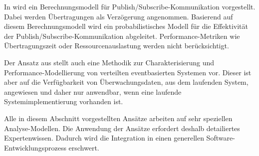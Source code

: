In \cite{baldoni} wird ein Berechnungsmodell für Publish/Subscribe-Kommunikation vorgestellt. Dabei werden Übertragungen als Verzögerung angenommen. Basierend auf diesem Berechnungsmodell wird ein probabilistisches Modell für die Effektivität der Publish/Subscribe-Kommunikation abgeleitet. Performance-Metriken wie Übertragungszeit oder Ressourcenauslastung werden nicht berücksichtigt. \par
Der Ansatz aus \cite{Kounev2008} stellt auch eine Methodik zur Charakterisierung und Performance-Modellierung von verteilten eventbasierten Systemen vor. Dieser ist aber auf die Verfügbarkeit von Überwachungsdaten, aus dem laufenden System, angewiesen und daher nur anwendbar, wenn eine laufende Systemimplementierung vorhanden ist. \par
Alle in diesem Abschnitt vorgestellten Ansätze arbeiten auf sehr speziellen Analyse-Modellen. Die Anwendung der Ansätze erfordert deshalb detailiertes Expertenwissen. Dadurch wird die Integration in einen generellen Software-Entwicklungsprozess erschwert.  


